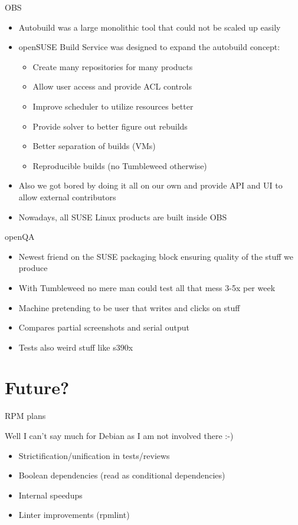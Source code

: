 \documentclass{beamer}
\begin{document}
\begin{frame}[t]{OBS}
	\begin{itemize}
	\item Autobuild was a large monolithic tool that could not be scaled up easily
	\item openSUSE Build Service was designed to expand the autobuild concept:
	\begin{itemize}
	\item Create many repositories for many products
	\item Allow user access and provide ACL controls
	\item Improve scheduler to utilize resources better
	\item Provide solver to better figure out rebuilds
	\item Better separation of builds (VMs)
	\item Reproducible builds (no Tumbleweed otherwise)
	\end{itemize}
	\item Also we got bored by doing it all on our own and provide API and UI to allow external contributors
	\item Nowadays, all SUSE Linux products are built inside OBS
	\end{itemize}
\end{frame}

\begin{frame}[t]{openQA}
	\begin{itemize}
	\item Newest friend on the SUSE packaging block ensuring quality of the stuff we produce
	\item With Tumbleweed no mere man could test all that mess 3-5x per week
	\item Machine pretending to be user that writes and clicks on stuff
	\item Compares partial screenshots and serial output
	\item Tests also weird stuff like s390x
	\end{itemize}
\end{frame}

\section{Future?}

\begin{frame}[t]{RPM plans}
    \begin{center}Well I can't say much for Debian as I am not involved there :-)\end{center}
	\begin{itemize}
	\item Strictification/unification in tests/reviews
	\item Boolean dependencies (read as conditional dependencies)
	\item Internal speedups
	\item Linter improvements (rpmlint)
	\end{itemize}
\end{frame}
\end{document}
